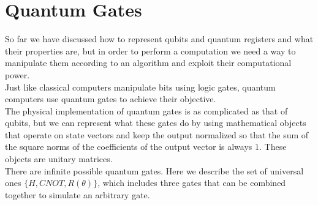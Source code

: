 \documentclass[12pt,a4paper]{report}
\theoremstyle{definition}
\theoremstyle{definition}
\theoremstyle{definition}
\begin{document}
\section{Quantum Gates}
So far we have discussed how to represent qubits and quantum registers and what their properties are, but in order to perform a computation we need a way to manipulate them according to an algorithm and exploit their computational power.\\
Just like classical computers manipulate bits using logic gates, quantum computers use quantum gates to achieve their objective.\\
The physical implementation of quantum gates is as complicated as that of qubits, but we can represent what these gates do by using mathematical objects that operate on state vectors and keep the output normalized so that the sum of the square norms of the coefficients of the output vector is always $1$. These objects are unitary matrices.\\
There are infinite possible quantum gates. Here we describe the set of universal ones $\{H, CNOT, R(\theta)\}$, which includes three gates that can be combined together to simulate an arbitrary gate.\\
\end{document}
